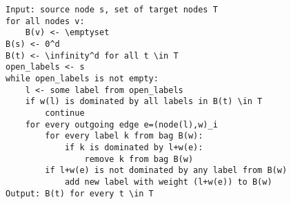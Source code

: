 
\renewcommand{\lstlistingname}{Pseudocode} 
\begin{lstlisting}[caption={MLS Algorithm},label=MLSalg,captionpos=t,float,abovecaptionskip=-\medskipamount]
Input: source node s, set of target nodes T
for all nodes v:
	B(v) <- \emptyset
B(s) <- 0^d
B(t) <- \infinity^d for all t \in T
open_labels <- s
while open_labels is not empty:
	l <- some label from open_labels
    if w(l) is dominated by all labels in B(t) \in T
    	continue
    for every outgoing edge e=(node(l),w)_i
    	for every label k from bag B(w):
        	if k is dominated by l+w(e):
            	remove k from bag B(w)
        if l+w(e) is not dominated by any label from B(w)
        	add new label with weight (l+w(e)) to B(w)
Output: B(t) for every t \in T
\end{lstlisting}


